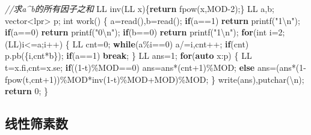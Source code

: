 \documentclass[
]{article}
\newenvironment{Shaded}{}{}
\newcommand{\CharTok}[1]{\textcolor[rgb]{0.25,0.44,0.63}{#1}}
\newcommand{\CommentTok}[1]{\textcolor[rgb]{0.38,0.63,0.69}{\textit{#1}}}
\newcommand{\ControlFlowTok}[1]{\textcolor[rgb]{0.00,0.44,0.13}{\textbf{#1}}}
\newcommand{\DataTypeTok}[1]{\textcolor[rgb]{0.56,0.13,0.00}{#1}}
\newcommand{\DecValTok}[1]{\textcolor[rgb]{0.25,0.63,0.44}{#1}}
\newcommand{\KeywordTok}[1]{\textcolor[rgb]{0.00,0.44,0.13}{\textbf{#1}}}
\newcommand{\NormalTok}[1]{#1}
\newcommand{\SpecialCharTok}[1]{\textcolor[rgb]{0.25,0.44,0.63}{#1}}
\newcommand{\StringTok}[1]{\textcolor[rgb]{0.25,0.44,0.63}{#1}}
\begin{document}
\begin{Shaded}
\begin{Highlighting}[]
\CommentTok{//求a\^{}b的所有因子之和}
\NormalTok{LL inv(LL x)\{}\ControlFlowTok{return}\NormalTok{ fpow(x,MOD{-}}\DecValTok{2}\NormalTok{);\}}
\NormalTok{LL a,b;}
\NormalTok{vector\textless{}lpr\textgreater{} p;}
\DataTypeTok{int}\NormalTok{ work()}
\NormalTok{\{}
\NormalTok{    a=read(),b=read();}
    \ControlFlowTok{if}\NormalTok{(a==}\DecValTok{1}\NormalTok{) }\ControlFlowTok{return}\NormalTok{ printf(}\StringTok{"1}\SpecialCharTok{\textbackslash{}n}\StringTok{"}\NormalTok{);}
    \ControlFlowTok{if}\NormalTok{(a==}\DecValTok{0}\NormalTok{) }\ControlFlowTok{return}\NormalTok{ printf(}\StringTok{"0}\SpecialCharTok{\textbackslash{}n}\StringTok{"}\NormalTok{);}
    \ControlFlowTok{if}\NormalTok{(b==}\DecValTok{0}\NormalTok{) }\ControlFlowTok{return}\NormalTok{ printf(}\StringTok{"1}\SpecialCharTok{\textbackslash{}n}\StringTok{"}\NormalTok{);}
    \ControlFlowTok{for}\NormalTok{(}\DataTypeTok{int}\NormalTok{ i=}\DecValTok{2}\NormalTok{;(LL)i\textless{}=a;i++)}
\NormalTok{    \{}
\NormalTok{        LL cnt=}\DecValTok{0}\NormalTok{;}
        \ControlFlowTok{while}\NormalTok{(a\%i==}\DecValTok{0}\NormalTok{) a/=i,cnt++;}
        \ControlFlowTok{if}\NormalTok{(cnt) p.pb(\{i,cnt*b\});}
        \ControlFlowTok{if}\NormalTok{(a==}\DecValTok{1}\NormalTok{) }\ControlFlowTok{break}\NormalTok{;}
\NormalTok{    \}}
\NormalTok{    LL ans=}\DecValTok{1}\NormalTok{;}
    \ControlFlowTok{for}\NormalTok{(}\KeywordTok{auto}\NormalTok{ x:p)}
\NormalTok{    \{}
\NormalTok{        LL t=x.fi,cnt=x.se;}
        \ControlFlowTok{if}\NormalTok{((}\DecValTok{1}\NormalTok{{-}t)\%MOD==}\DecValTok{0}\NormalTok{) ans=ans*(cnt+}\DecValTok{1}\NormalTok{)\%MOD;}
        \ControlFlowTok{else}\NormalTok{ ans=(ans*(}\DecValTok{1}\NormalTok{{-}fpow(t,cnt+}\DecValTok{1}\NormalTok{))\%MOD*inv(}\DecValTok{1}\NormalTok{{-}t)\%MOD+MOD)\%MOD;}
\NormalTok{    \}}
\NormalTok{    write(ans),putchar(}\CharTok{\textquotesingle{}}\SpecialCharTok{\textbackslash{}n}\CharTok{\textquotesingle{}}\NormalTok{);}
    \ControlFlowTok{return} \DecValTok{0}\NormalTok{;}
\NormalTok{\}}
\end{Highlighting}
\end{Shaded}

\hypertarget{ux7ebfux6027ux7b5bux7d20ux6570}{%
\subsection{线性筛素数}\label{ux7ebfux6027ux7b5bux7d20ux6570}}
\end{document}
